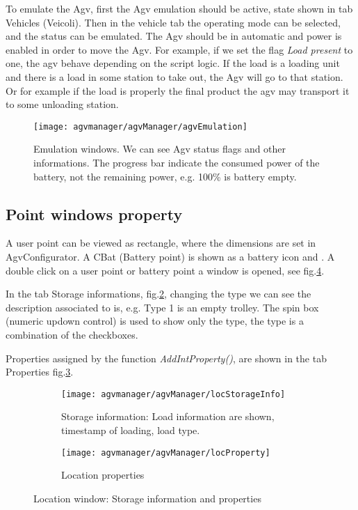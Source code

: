 To emulate the Agv, first the Agv emulation should be active, state shown in tab Vehicles (Veicoli). Then in the vehicle tab the operating mode can be selected, and the status can be emulated. The Agv should be in automatic and power is enabled in order to move the Agv.
For example, if we set the flag \textit{Load present} to one, the agv behave depending on the script logic. If the load is a loading unit and there is a load in some station to take out, the Agv will go to that station. Or for example if the load is properly the final product the agv may transport it to some unloading station.

\begin{figure}
	\centering\texttt{[image: agvmanager/agvManager/agvEmulation]}
	\caption{Emulation windows. We can see Agv status flags and other informations. The progress bar indicate the consumed power of the battery, not the remaining power, e.g. 100\% is battery empty. }
	\label{fig:refAgvEmu}
\end{figure}

\subsection{Point windows property}
A user point can be viewed as rectangle, where the dimensions are set in AgvConfigurator. A CBat (Battery point) is shown as a battery icon and . A double click on a user point or battery point a window is opened, see fig.\ref{fig:refLocation}.

In the tab Storage informations, fig.\ref{fig:refLocStorageInfo}, changing the type we can see the description associated to is, e.g. Type 1 is an empty trolley. The spin box (numeric updown control) is used to show only the type, the type is a combination of the checkboxes.

Properties assigned by the function \textit{AddIntProperty()}, are shown in the tab Properties fig.\ref{fig:refLocationProperties}.

\begin{figure}[h]
	\centering
	\begin{subfigure}[b]{0.5\textwidth}
		\texttt{[image: agvmanager/agvManager/locStorageInfo]}
		\caption{Storage information: Load information are shown, timestamp of loading, load type.}
		\label{fig:refLocStorageInfo}
	\end{subfigure}
	\quad
	\begin{subfigure}[b]{0.5\textwidth}
		\texttt{[image: agvmanager/agvManager/locProperty]}
		\caption{Location properties}
		\label{fig:refLocationProperties}
	\end{subfigure}
	\caption{Location window: Storage information and properties}\label{fig:refLocation}
\end{figure}

